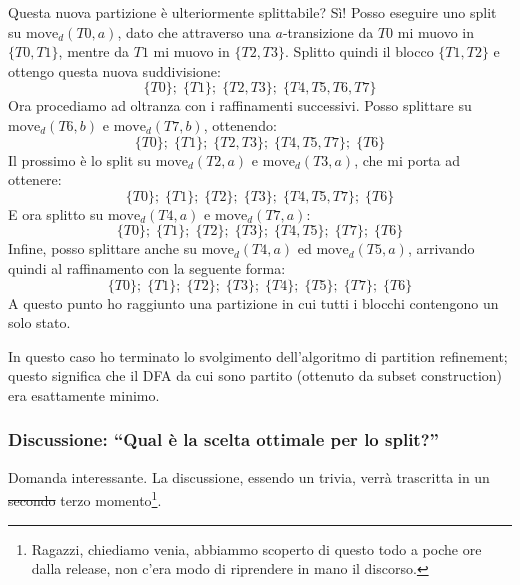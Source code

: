\documentclass[class=book, crop=false, oneside, 12pt]{standalone}
\begin{document}
Questa nuova partizione è ulteriormente splittabile? Sì! Posso eseguire uno split su \(\textrm{move}_d(T0, a)\), dato che attraverso una \(a\)-transizione da \(T0\) mi muovo in \(\{T0,T1\}\), mentre da \(T1\) mi muovo in \(\{T2,T3\}\). Splitto quindi il blocco \(\{T1,T2\}\) e ottengo questa nuova suddivisione:
\begin{equation*}
    \{T0\};\; \{T1\};\; \{T2, T3\};\; \{T4,T5,T6,T7\}
\end{equation*}
Ora procediamo ad oltranza con i raffinamenti successivi. Posso splittare su \(\textrm{move}_d(T6,b)\) e \(\textrm{move}_d(T7,b)\), ottenendo:
\begin{equation*}
    \{T0\};\; \{T1\};\; \{T2, T3\};\; \{T4,T5,T7\};\; \{T6\}
\end{equation*}
Il prossimo è lo split su \(\textrm{move}_d(T2, a)\) e \(\textrm{move}_d(T3, a)\), che mi porta ad ottenere:
\begin{equation*}
    \{T0\};\; \{T1\};\; \{T2\};\; \{T3\};\; \{T4,T5,T7\};\; \{T6\}
\end{equation*}
E ora splitto su \(\textrm{move}_d(T4, a)\) e \(\textrm{move}_d(T7, a)\):
\begin{equation*}
    \{T0\};\; \{T1\};\; \{T2\};\; \{T3\};\; \{T4,T5\};\; \{T7\};\; \{T6\}
\end{equation*}
Infine, posso splittare anche su \(\textrm{move}_d(T4, a)\) ed \(\textrm{move}_d(T5, a)\), arrivando quindi al raffinamento con la seguente forma:
\begin{equation*}
    \{T0\};\; \{T1\};\; \{T2\};\; \{T3\};\; \{T4\};\; \{T5\};\; \{T7\};\; \{T6\}
\end{equation*}
A questo punto ho raggiunto una partizione in cui tutti i blocchi contengono un solo stato.

In questo caso ho terminato lo svolgimento dell'algoritmo di partition refinement; questo significa che il DFA da cui sono partito (ottenuto da subset construction) era esattamente minimo.

\subsubsection[Tutta da risistemare]{Discussione: “Qual è la scelta ottimale per lo split?”}
Domanda interessante. La discussione, essendo un trivia, verrà trascritta in un \sout{secondo} terzo momento\footnote{Ragazzi, chiediamo venia, abbiammo scoperto di questo todo a poche ore dalla release, non c'era modo di riprendere in mano il discorso.}.
\end{document}
